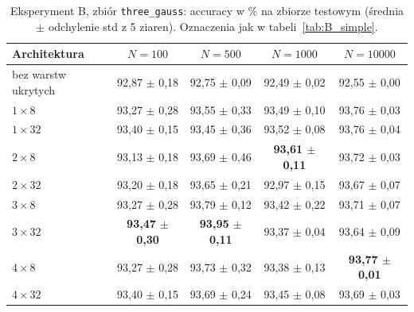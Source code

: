 \documentclass[11pt,a4paper]{article}
\begin{document}
	\begin{table}[H]
		\centering
		\footnotesize
		\caption{Eksperyment B, zbiór \texttt{three\_gauss}: accuracy w \% na zbiorze testowym (średnia $\pm$ odchylenie std z 5 ziaren). Oznaczenia jak w tabeli~\ref{tab:B_simple}.}\label{tab:B_three}
		\begin{tabular}{@{}lcccc@{}}
			\toprule
			Architektura & $N=100$ & $N=500$ & $N=1000$ & $N=10000$ \\
			\midrule
			bez warstw ukrytych & 92,87 $\pm$ 0,18 & 92,75 $\pm$ 0,09 & 92,49 $\pm$ 0,02 & 92,55 $\pm$ 0,00 \\
			$1\times8$ & 93,27 $\pm$ 0,28 & 93,55 $\pm$ 0,33 & 93,49 $\pm$ 0,10 & 93,76 $\pm$ 0,03 \\
			$1\times32$ & 93,40 $\pm$ 0,15 & 93,45 $\pm$ 0,36 & 93,52 $\pm$ 0,08 & 93,76 $\pm$ 0,04 \\
			$2\times8$ & 93,13 $\pm$ 0,18 & 93,69 $\pm$ 0,46 & \textbf{93,61 $\pm$ 0,11} & 93,72 $\pm$ 0,03 \\
			$2\times32$ & 93,20 $\pm$ 0,18 & 93,65 $\pm$ 0,21 & 92,97 $\pm$ 0,15 & 93,67 $\pm$ 0,07 \\
			$3\times8$ & 93,27 $\pm$ 0,28 & 93,79 $\pm$ 0,12 & 93,42 $\pm$ 0,22 & 93,71 $\pm$ 0,07 \\
			$3\times32$ & \textbf{93,47 $\pm$ 0,30} & \textbf{93,95 $\pm$ 0,11} & 93,37 $\pm$ 0,04 & 93,64 $\pm$ 0,09 \\
			$4\times8$ & 93,27 $\pm$ 0,28 & 93,73 $\pm$ 0,32 & 93,38 $\pm$ 0,13 & \textbf{93,77 $\pm$ 0,01} \\
			$4\times32$ & 93,40 $\pm$ 0,15 & 93,69 $\pm$ 0,24 & 93,45 $\pm$ 0,08 & 93,69 $\pm$ 0,03 \\
			\bottomrule
		\end{tabular}
	\end{table}
	
\end{document}
